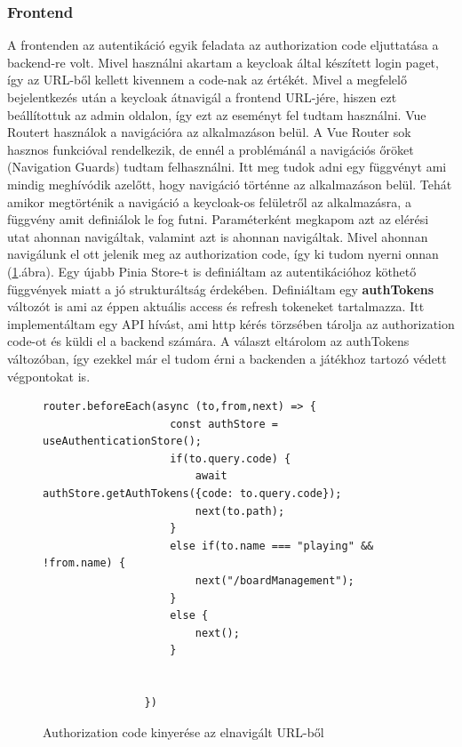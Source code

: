 \documentclass[a4paper,twoside]{article}
\begin{document}
\subsubsection{Frontend}
A frontenden az autentikáció egyik feladata az authorization code eljuttatása a backend-re volt. Mivel használni akartam a keycloak által 
készített login paget, így az URL-ből kellett kivennem a code-nak az értékét. Mivel a megfelelő bejelentkezés után a keycloak átnavigál a frontend 
URL-jére, hiszen ezt beállítottuk az admin oldalon, így ezt az eseményt fel tudtam használni. Vue Routert használok a navigációra az alkalmazáson belül. A Vue Router 
sok hasznos funkcióval rendelkezik, de ennél a problémánál a navigációs őröket (Navigation Guards) tudtam felhasználni. Itt meg tudok adni egy függvényt ami
mindig meghívódik azelőtt, hogy navigáció történne az alkalmazáson belül. Tehát amikor megtörténik a navigáció a keycloak-os felületről az alkalmazásra, a függvény amit 
definiálok le fog futni. Paraméterként megkapom azt az elérési utat ahonnan navigáltak, valamint azt is ahonnan navigáltak. Mivel ahonnan navigálunk el ott jelenik meg az
authorization code, így ki tudom nyerni onnan (\ref{authCode}.ábra). Egy újabb Pinia Store-t is definiáltam az autentikációhoz köthető függvények miatt a jó strukturáltság érdekében. Definiáltam egy \textbf{authTokens} változót is ami az éppen aktuális access és refresh tokeneket tartalmazza. Itt implementáltam egy API hívást, ami http kérés törzsében tárolja az authorization code-ot és küldi el a backend számára. A választ eltárolom az authTokens változóban, így ezekkel már el tudom érni a backenden a játékhoz tartozó védett végpontokat is. 
\begin{figure}
	\caption{Authorization code kinyerése az elnavigált URL-ből}

		\begin{minipage}{\textwidth}
			\begin{lstlisting}[style=javascriptStyle]
				router.beforeEach(async (to,from,next) => {
					const authStore = useAuthenticationStore();
					if(to.query.code) {
						await authStore.getAuthTokens({code: to.query.code});
						next(to.path);
					}
					else if(to.name === "playing" && !from.name) {
						next("/boardManagement");
					}
					else {
						next();
					}
					
					
				})
			\end{lstlisting}
		\end{minipage}
	
	\label{authCode}
\end{figure}
\FloatBarrier
\end{document}
